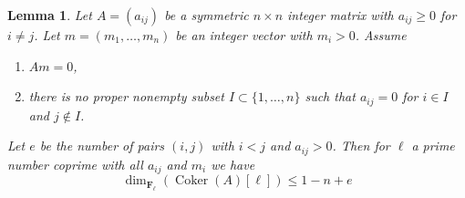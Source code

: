 \documentclass{stacks-project}
\theoremstyle{plain}
\newtheorem{lemma}[subsection]{Lemma}
\theoremstyle{definition}
\theoremstyle{remark}
\numberwithin{equation}{subsection}
\def\Coker{\mathop{\mathrm{Coker}}}
\begin{document}
\begin{lemma}
\label{lemma-recurring-symmetric-integer}
Let $A = (a_{ij})$ be a symmetric $n \times n$ integer matrix with
$a_{ij} \geq 0$ for $i \not = j$. Let $m = (m_1, \ldots, m_n)$ be an
integer vector with $m_i > 0$. Assume
\begin{enumerate}
\item $Am = 0$,
\item there is no proper nonempty subset $I \subset \{1, \ldots, n\}$
such that $a_{ij} = 0$ for $i \in I$ and $j \not \in I$.
\end{enumerate}
Let $e$ be the number of pairs $(i, j)$ with $i < j$ and $a_{ij} > 0$.
Then for $\ell$ a prime number coprime with all $a_{ij}$ and $m_i$
we have
$$
\dim_{\mathbf{F}_\ell}(\Coker(A)[\ell]) \leq 1 - n + e
$$
\end{lemma}
\end{document}
